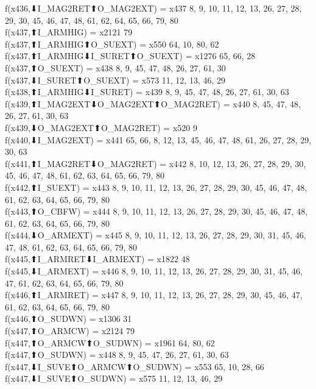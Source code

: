 f(x436,⬇I_MAG2RET⬆O_MAG2EXT) = x437 {8, 9, 10, 11, 12, 13, 26, 27, 28, 29, 30, 45, 46, 47, 48, 61, 62, 64, 65, 66, 79, 80} \\
f(x437,⬆I_ARMHIG) = x2121 {79} \\
f(x437,⬆I_ARMHIG⬆O_SUEXT) = x550 {64, 10, 80, 62} \\
f(x437,⬆I_ARMHIG⬇I_SURET⬆O_SUEXT) = x1276 {65, 66, 28} \\
f(x437,⬆O_SUEXT) = x438 {8, 9, 45, 47, 48, 26, 27, 61, 30} \\
f(x437,⬇I_SURET⬆O_SUEXT) = x573 {11, 12, 13, 46, 29} \\
f(x438,⬆I_ARMHIG⬇I_SURET) = x439 {8, 9, 45, 47, 48, 26, 27, 61, 30, 63} \\
f(x439,⬆I_MAG2EXT⬇O_MAG2EXT⬆O_MAG2RET) = x440 {8, 45, 47, 48, 26, 27, 61, 30, 63} \\
f(x439,⬇O_MAG2EXT⬆O_MAG2RET) = x520 {9} \\
f(x440,⬇I_MAG2EXT) = x441 {65, 66, 8, 12, 13, 45, 46, 47, 48, 61, 26, 27, 28, 29, 30, 63} \\
f(x441,⬆I_MAG2RET⬇O_MAG2RET) = x442 {8, 10, 12, 13, 26, 27, 28, 29, 30, 45, 46, 47, 48, 61, 62, 63, 64, 65, 66, 79, 80} \\
f(x442,⬆I_SUEXT) = x443 {8, 9, 10, 11, 12, 13, 26, 27, 28, 29, 30, 45, 46, 47, 48, 61, 62, 63, 64, 65, 66, 79, 80} \\
f(x443,⬆O_CBFW) = x444 {8, 9, 10, 11, 12, 13, 26, 27, 28, 29, 30, 45, 46, 47, 48, 61, 62, 63, 64, 65, 66, 79, 80} \\
f(x444,⬇O_ARMEXT) = x445 {8, 9, 10, 11, 12, 13, 26, 27, 28, 29, 30, 31, 45, 46, 47, 48, 61, 62, 63, 64, 65, 66, 79, 80} \\
f(x445,⬆I_ARMRET⬇I_ARMEXT) = x1822 {48} \\
f(x445,⬇I_ARMEXT) = x446 {8, 9, 10, 11, 12, 13, 26, 27, 28, 29, 30, 31, 45, 46, 47, 61, 62, 63, 64, 65, 66, 79, 80} \\
f(x446,⬆I_ARMRET) = x447 {8, 9, 10, 11, 12, 13, 26, 27, 28, 29, 30, 45, 46, 47, 61, 62, 63, 64, 65, 66, 79, 80} \\
f(x446,⬆O_SUDWN) = x1306 {31} \\
f(x447,⬆O_ARMCW) = x2124 {79} \\
f(x447,⬆O_ARMCW⬆O_SUDWN) = x1961 {64, 80, 62} \\
f(x447,⬆O_SUDWN) = x448 {8, 9, 45, 47, 26, 27, 61, 30, 63} \\
f(x447,⬇I_SUVE⬆O_ARMCW⬆O_SUDWN) = x553 {65, 10, 28, 66} \\
f(x447,⬇I_SUVE⬆O_SUDWN) = x575 {11, 12, 13, 46, 29} \\

